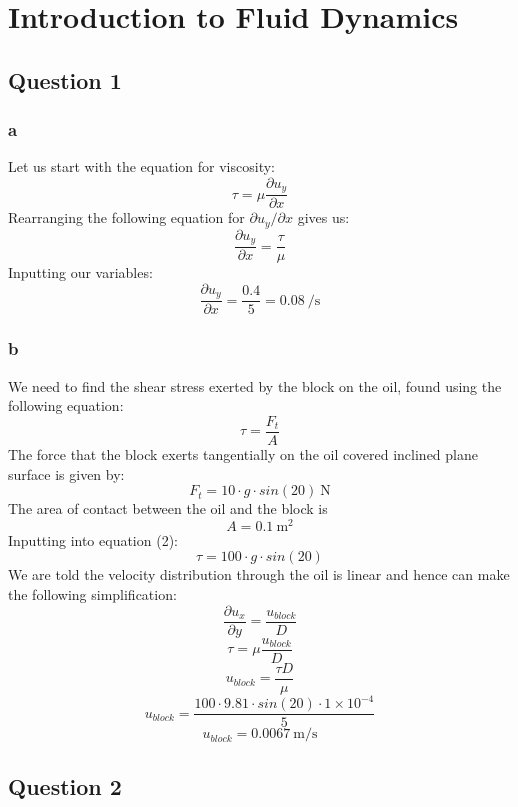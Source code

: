 \documentclass[class=report, crop=false, 12pt,a4paper]{standalone}
\begin{document}
\section{Introduction to Fluid Dynamics}
\subsection{Question 1}
\subsubsection{a}
Let us start with the equation for viscosity:
\begin{equation}
  \tau = \mu \frac{\partial u_y}{\partial x}
\end{equation}
Rearranging the following equation for \(\partial u_y / \partial x \) gives us:
\[ \frac{\partial u_y}{\partial x} = \frac{\tau}{\mu}\]
Inputting our variables:
\[ \frac{\partial u_y}{\partial x} = \frac{0.4}{5} = 0.08 \ \si{\per\second}\]

\subsubsection{b}
We need to find the shear stress exerted by the block on the oil, found using the following equation:
\begin{equation}
  \tau = \frac{F_t}{A}
\end{equation}
The force that the block exerts tangentially on the oil covered inclined plane surface is given by:
\[ F_t = 10\cdot g \cdot sin(20) \ \si{\newton} \]
The area of contact between the oil and the block is
\[ A = 0.1 \ \si{\meter \squared}\]
Inputting into equation (2):
\[ \tau = 100\cdot g \cdot sin(20) \]
We are told the velocity distribution through the oil is linear and hence can make the following simplification:
\[ \frac{\partial u_x}{\partial y} = \frac{u_{block}}{D} \]
\[ \tau = \mu \frac{u_{block}}{D} \]
\[ u_{block} = \frac{\tau D}{\mu} \]
\[ u_{block} = \frac{100 \cdot 9.81 \cdot sin(20) \cdot 1\times 10^{-4}}{5} \]
\[ u_{block} = 0.0067 \ \si{\meter \per \second} \]
\subsection{Question 2}
\end{document}
